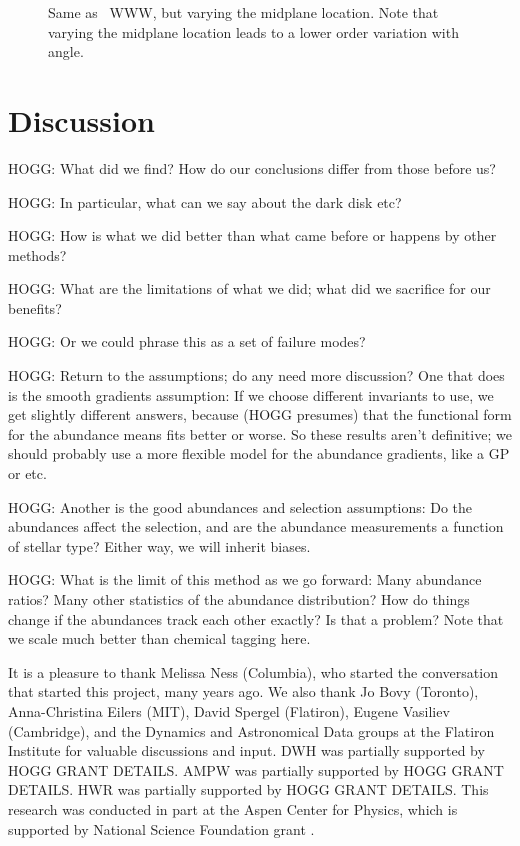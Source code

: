 \documentclass[modern]{aastex63}
\begin{document}
\begin{figure}
\caption{Same as \figurename~WWW, but varying the midplane location. Note
that varying the midplane location leads to a lower order variation with angle.\label{fig:midplane}}
\end{figure}

\section{Discussion}

HOGG: What did we find? How do our conclusions differ from those before us?

HOGG: In particular, what can we say about the dark disk etc?

HOGG: How is what we did better than what came before or happens by other methods?

HOGG: What are the limitations of what we did; what did we sacrifice for our benefits?

HOGG: Or we could phrase this as a set of failure modes?

HOGG: Return to the assumptions; do any need more discussion? One that does is the smooth
gradients assumption: If we choose different invariants to use, we get slightly different
answers, because (HOGG presumes) that the functional form for the abundance means fits
better or worse. So these results aren't definitive; we should probably use a more flexible
model for the abundance gradients, like a GP or etc.

HOGG: Another is the good abundances and selection assumptions: Do the abundances affect
the selection, and are the abundance measurements a function of stellar type? Either way,
we will inherit biases.

HOGG: What is the limit of this method as we go forward: Many abundance ratios? Many other
statistics of the abundance distribution? How do things change if the abundances track
each other exactly? Is that a problem? Note that we scale much better than chemical tagging
here.

\acknowledgments
It is a pleasure to thank
  Melissa Ness (Columbia),
  who started the conversation that started this project, many years ago.
We also thank
  Jo Bovy (Toronto),
  Anna-Christina Eilers (MIT),
  David Spergel (Flatiron),
  Eugene Vasiliev (Cambridge),
  and the Dynamics and Astronomical Data groups at the Flatiron Institute
for valuable discussions and input.
DWH was partially supported by HOGG GRANT DETAILS.
AMPW was partially supported by HOGG GRANT DETAILS.
HWR was partially supported by HOGG GRANT DETAILS.
This research was conducted in part at the Aspen Center for Physics,
which is supported by National Science Foundation grant .
\end{document}
